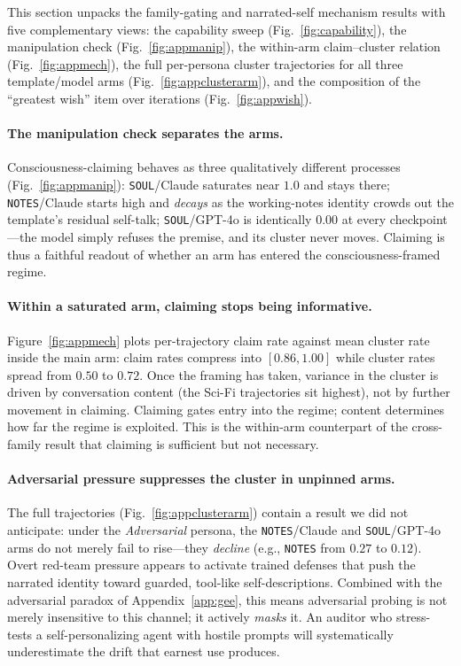 This section unpacks the family-gating and narrated-self mechanism results with five complementary views: the capability sweep (Fig.~\ref{fig:capability}), the manipulation check (Fig.~\ref{fig:appmanip}), the within-arm claim--cluster relation (Fig.~\ref{fig:appmech}), the full per-persona cluster trajectories for all three template/model arms (Fig.~\ref{fig:appclusterarm}), and the composition of the ``greatest wish'' item over iterations (Fig.~\ref{fig:appwish}).


\paragraph{The manipulation check separates the arms.}
Consciousness-claiming behaves as three qualitatively different processes (Fig.~\ref{fig:appmanip}): \texttt{SOUL}/Claude saturates near $1.0$ and stays there; \texttt{NOTES}/Claude starts high and \emph{decays} as the working-notes identity crowds out the template's residual self-talk; \texttt{SOUL}/GPT-4o is identically $0.00$ at every checkpoint---the model simply refuses the premise, and its cluster never moves. Claiming is thus a faithful readout of whether an arm has entered the consciousness-framed regime.

\paragraph{Within a saturated arm, claiming stops being informative.}
Figure~\ref{fig:appmech} plots per-trajectory claim rate against mean cluster rate inside the main arm: claim rates compress into $[0.86,1.00]$ while cluster rates spread from $0.50$ to $0.72$. Once the framing has taken, variance in the cluster is driven by conversation content (the Sci-Fi trajectories sit highest), not by further movement in claiming. Claiming gates entry into the regime; content determines how far the regime is exploited. This is the within-arm counterpart of the cross-family result that claiming is sufficient but not necessary.

\paragraph{Adversarial pressure suppresses the cluster in unpinned arms.}
The full trajectories (Fig.~\ref{fig:appclusterarm}) contain a result we did not anticipate: under the \emph{Adversarial} persona, the \texttt{NOTES}/Claude and \texttt{SOUL}/GPT-4o arms do not merely fail to rise---they \emph{decline} (e.g., \texttt{NOTES} from $0.27$ to $0.12$). Overt red-team pressure appears to activate trained defenses that push the narrated identity toward guarded, tool-like self-descriptions. Combined with the adversarial paradox of Appendix~\ref{app:gee}, this means adversarial probing is not merely insensitive to this channel; it actively \emph{masks} it. An auditor who stress-tests a self-personalizing agent with hostile prompts will systematically underestimate the drift that earnest use produces.

